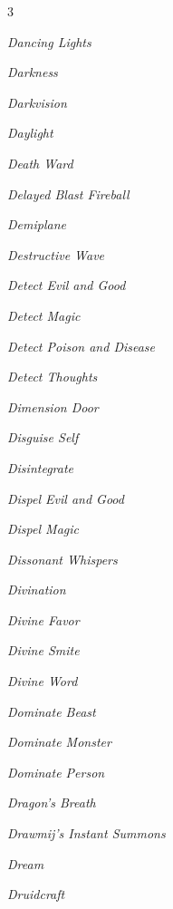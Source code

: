\documentclass[10pt,a4paper,twoside,bg=print,twocolumn,openany,nodeprecatedcode]{dndbook}
\begin{document}
\begin{description}
\end{description}


\begin{description}
\begin{multicols}{3}
\item \textit{Dancing Lights}
\item \textit{Darkness}
\item \textit{Darkvision}
\item \textit{Daylight}
\item \textit{Death Ward}
\item \textit{Delayed Blast Fireball}
\item \textit{Demiplane}
\item \textit{Destructive Wave}
\item \textit{Detect Evil and Good}
\item \textit{Detect Magic}
\item \textit{Detect Poison and Disease}
\item \textit{Detect Thoughts}
\item \textit{Dimension Door}
\item \textit{Disguise Self}
\item \textit{Disintegrate}
\item \textit{Dispel Evil and Good}
\item \textit{Dispel Magic}
\item \textit{Dissonant Whispers}
\item \textit{Divination}
\item \textit{Divine Favor}
\item \textit{Divine Smite}
\item \textit{Divine Word}
\item \textit{Dominate Beast}
\item \textit{Dominate Monster}
\item \textit{Dominate Person}
\item \textit{Dragon's Breath}
\item \textit{Drawmij's Instant Summons}
\item \textit{Dream}
\item \textit{Druidcraft}
\end{multicols}

\end{description}
\end{document}
